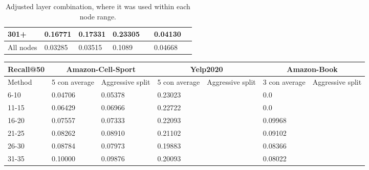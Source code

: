 \begin{table*}[h!]
\begin{tabular}{|l|l|l||l|l||l|l|}
        301+      & 0.16771                                 & 0.17331                               & 0.23305                          &                  & 0.04130       &                  \\ \hline
        All nodes & 0.03285                                 & 0.03515                               & 0.1089                           &                  & 0.04668       &                  \\ \hline
    \end{tabular}
    \caption{Adjusted layer combination, where it was used within each node range.}
    \label{tab:ndcg-adjusted-layer-bad-performance}
\end{table*}

\begin{table*}[h!]
    \centering
    \begin{tabular}{|l|l|l||l|l||l|l|}
        \hline
        Recall@50 & \multicolumn{2}{c||}{Amazon-Cell-Sport} & \multicolumn{2}{c||}{Yelp2020} & \multicolumn{2}{c|}{Amazon-Book}                                                       \\ \hline
        Method    & 5 con average                           & Aggressive split               & 5 con average                    & Aggressive split & 3 con average & Aggressive split \\ \hline
        6-10      & 0.04706                                 & 0.05378                        & 0.23023                          &                  & 0.0           &                  \\ \hline
        11-15     & 0.06429                                 & 0.06966                        & 0.22722                          &                  & 0.0           &                  \\ \hline
        16-20     & 0.07557                                 & 0.07333                        & 0.22093                          &                  & 0.09968       &                  \\ \hline
        21-25     & 0.08262                                 & 0.08910                        & 0.21102                          &                  & 0.09102       &                  \\ \hline
        26-30     & 0.08784                                 & 0.07973                        & 0.19883                          &                  & 0.08366       &                  \\ \hline
        31-35     & 0.10000                                 & 0.09876                        & 0.20093                          &                  & 0.08022       &                  \\ \hline

\end{tabular}
\end{table*}
